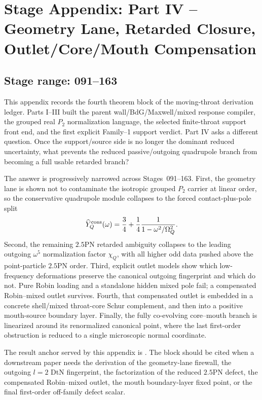 
\chapter{Stage Appendix: Part IV -- Geometry Lane, Retarded Closure, Outlet/Core/Mouth Compensation}
\label{app:stage-part-4}

\section*{Stage range: 091--163}

This appendix records the fourth theorem block of the moving-throat derivation ledger.  Parts I--III built the parent wall/BdG/Maxwell/mixed response compiler, the grouped real \(P_2\) normalization language, the selected finite-throat support front end, and the first explicit Family--1 support verdict.  Part IV asks a different question.  Once the support/source side is no longer the dominant reduced uncertainty, what prevents the reduced passive/outgoing quadrupole branch from becoming a full usable retarded branch?

The answer is progressively narrowed across Stages~091--163.  First, the geometry lane is shown not to contaminate the isotropic grouped \(P_2\) carrier at linear order, so the conservative quadrupole module collapses to the forced contact-plus-pole split
\begin{equation}
\label{eq:app-part04-intro-3quarter-module}
\widehat Y_Q^{\rm cons}(\omega)
=
\frac34+\frac14\frac{1}{1-\omega^2/\Omega_Q^2}.
\end{equation}
Second, the remaining \(2.5\)PN retarded ambiguity collapses to the leading outgoing \(\omega^5\) normalization factor \(\chi_Q\), with all higher odd data pushed above the point-particle \(2.5\)PN order.  Third, explicit outlet models show which low-frequency deformations preserve the canonical outgoing fingerprint and which do not.  Pure Robin loading and a standalone hidden mixed pole fail; a compensated Robin--mixed outlet survives.  Fourth, that compensated outlet is embedded in a concrete shell/mixed throat-core Schur complement, and then into a positive mouth-source boundary layer.  Finally, the fully co-evolving core--mouth branch is linearized around its renormalized canonical point, where the last first-order obstruction is reduced to a single microscopic normal coordinate.

The result anchor served by this appendix is .  The block should be cited when a downstream paper needs the derivation of the geometry-lane firewall, the outgoing \(l=2\) DtN fingerprint, the factorization of the reduced \(2.5\)PN defect, the compensated Robin--mixed outlet, the mouth boundary-layer fixed point, or the final first-order off-family defect scalar.


